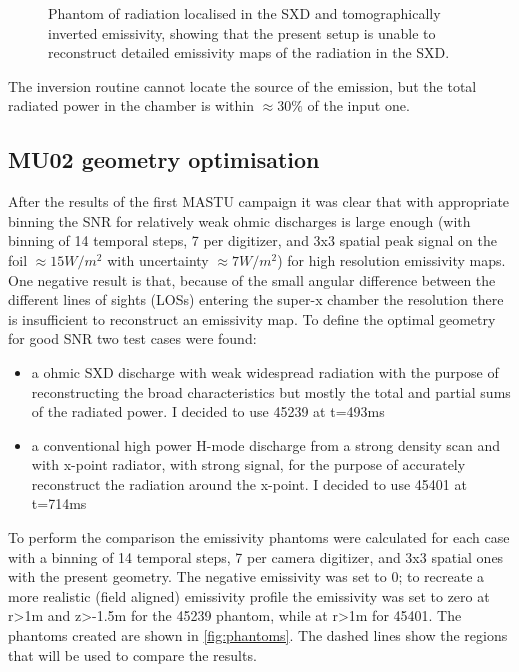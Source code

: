 \begin{figure}
    \caption{Phantom of radiation localised in the SXD and tomographically inverted emissivity, showing that the present setup is unable to reconstruct detailed emissivity maps of the radiation in the SXD.}
    \label{fig:sxd_bad}
\end{figure}


The inversion routine cannot locate the source of the emission, but the total radiated power in the chamber is within $\approx 30\%$ of the input one.

\subsection{MU02 geometry optimisation}

After the results of the first MASTU campaign it was clear that with appropriate binning the SNR for relatively weak ohmic discharges is large enough (with binning of 14 temporal steps, 7 per digitizer, and 3x3 spatial peak signal on the foil $\approx 15W/m^2$ with uncertainty $\approx 7W/m^2$) for high resolution emissivity maps. One negative result is that, because of the small angular difference between the different lines of sights (LOSs) entering the super-x chamber the resolution there is insufficient to reconstruct an emissivity map.
To define the optimal geometry for good SNR two test cases were found:
\begin{itemize}
    \item a ohmic SXD discharge with weak widespread radiation with the purpose of reconstructing the broad characteristics but mostly the total and partial sums of the radiated power. I decided to use 45239 at t=493ms
    \item a conventional high power H-mode discharge from a strong density scan and with x-point radiator, with strong signal, for the purpose of accurately reconstruct the radiation around the x-point. I decided to use 45401 at t=714ms
\end{itemize}

To perform the comparison the emissivity phantoms were calculated for each case with a binning of 14 temporal steps, 7 per camera digitizer, and 3x3 spatial ones with the present geometry. The negative emissivity was set to 0; to recreate a more realistic (field aligned) emissivity profile the emissivity was set to zero at r>1m and z>-1.5m for the 45239 phantom, while at r>1m for 45401. The phantoms created are shown in \autoref{fig:phantoms}. The dashed lines show the regions that will be used to compare the results.

